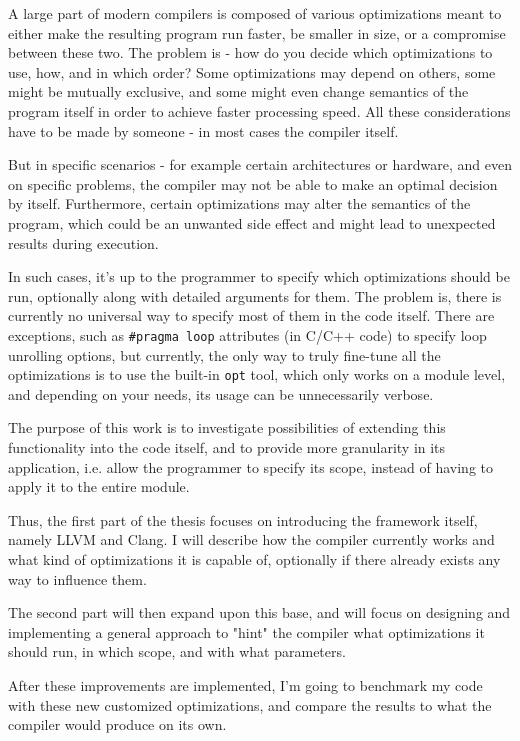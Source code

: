 A large part of modern compilers is composed of various optimizations meant to either make the resulting program run faster, be smaller in size, or a compromise between these two. The problem is - how do you decide which optimizations to use, how, and in which order? Some optimizations may depend on others, some might be mutually exclusive, and some might even change semantics of the program itself in order to achieve faster processing speed. All these considerations have to be made by someone - in most cases the compiler itself.

But in specific scenarios - for example certain architectures or hardware, and even on specific problems, the compiler may not be able to make an optimal decision by itself. Furthermore, certain optimizations may alter the semantics of the program, which could be an unwanted side effect and might lead to unexpected results during execution.

In such cases, it's up to the programmer to specify which optimizations should be run, optionally along with detailed arguments for them. The problem is, there is currently no universal way to specify most of them in the code itself. There are exceptions, such as \texttt{\#pragma loop} attributes (in C/C++ code) to specify loop unrolling options, but currently, the only way to truly fine-tune all the optimizations is to use the built-in \texttt{opt} tool, which only works on a module level, and depending on your needs, its usage can be unnecessarily verbose.

The purpose of this work is to investigate possibilities of extending this functionality into the code itself, and to provide more granularity in its application, i.e. allow the programmer to specify its scope, instead of having to apply it to the entire module.

Thus, the first part of the thesis focuses on introducing the framework itself, namely LLVM and Clang. I will describe how the compiler currently works and what kind of optimizations it is capable of, optionally if there already exists any way to influence them.

The second part will then expand upon this base, and will focus on designing and implementing a general approach to "hint" the compiler what optimizations it should run, in which scope, and with what parameters.

After these improvements are implemented, I'm going to benchmark my code with these new customized optimizations, and compare the results to what the compiler would produce on its own.